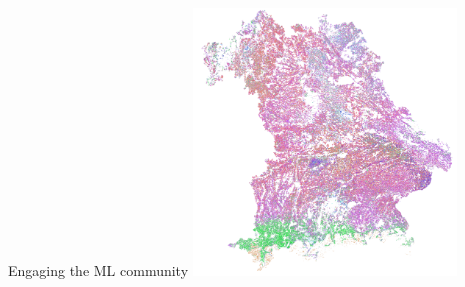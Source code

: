 


{
	\begin{frame}[plain]
	\vfill
	\begin{center}
		\Huge\color{black}
		Engaging the ML community
		\includegraphics[width=7cm]{images/Bavaria}
	\end{center}
	
	\vfill
\end{frame}
}

